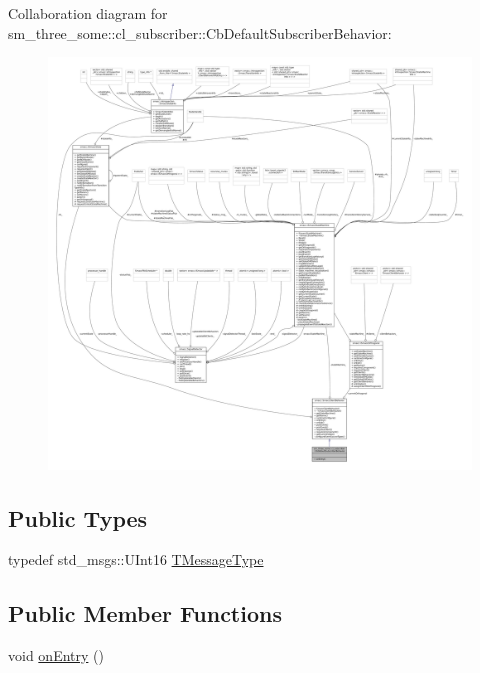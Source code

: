 Collaboration diagram for sm\+\_\+three\+\_\+some\+:\+:cl\+\_\+subscriber\+:\+:Cb\+Default\+Subscriber\+Behavior\+:
\nopagebreak
\begin{figure}[H]
\begin{center}
\leavevmode
\includegraphics[width=350pt]{classsm__three__some_1_1cl__subscriber_1_1CbDefaultSubscriberBehavior__coll__graph}
\end{center}
\end{figure}
\subsection*{Public Types}
\begin{DoxyCompactItemize}
\item 
typedef std\+\_\+msgs\+::\+U\+Int16 \hyperlink{classsm__three__some_1_1cl__subscriber_1_1CbDefaultSubscriberBehavior_a963e1040a9d7d8d49024b4d8f350895d}{T\+Message\+Type}
\end{DoxyCompactItemize}
\subsection*{Public Member Functions}
\begin{DoxyCompactItemize}
\item 
void \hyperlink{classsm__three__some_1_1cl__subscriber_1_1CbDefaultSubscriberBehavior_a9d1f8dfb490a26b1fcdab1b740436837}{on\+Entry} ()
\end{DoxyCompactItemize}


